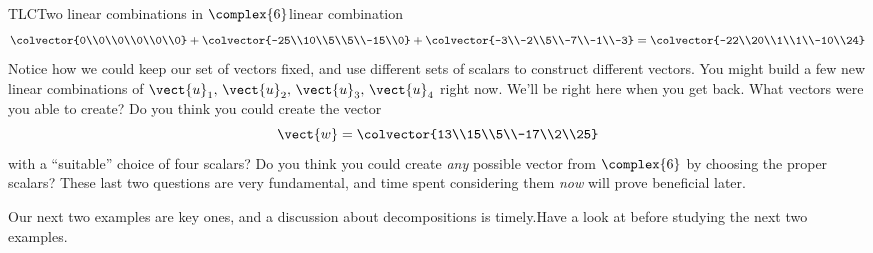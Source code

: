 \begin{example}{TLC}{Two linear combinations in $\complex{6}$}{linear combination}
\begin{align*}
\colvector{0\\0\\0\\0\\0\\0}+
\colvector{-25\\10\\5\\5\\-15\\0}+
\colvector{-3\\-2\\5\\-7\\-1\\-3}
%
=\colvector{-22\\20\\1\\1\\-10\\24}
\end{align*}
%
Notice how we could keep our set of vectors fixed, and use different sets of scalars to construct different vectors.  You might build a few new linear combinations of $\vect{u}_1,\,\vect{u}_2,\,\vect{u}_3,\,\vect{u}_4$ right now.  We'll be right here when you get back.  What vectors were you able to create?  Do you think you could create the vector
%
\begin{equation*}
\vect{w}=\colvector{13\\15\\5\\-17\\2\\25}
\end{equation*}
%
with a ``suitable'' choice of four scalars?  Do you think you could create {\em any} possible vector from $\complex{6}$ by choosing the proper scalars?  These last two questions are very fundamental, and time spent considering them {\em now} will prove beneficial later.
\end{example}
%
{Our next two examples are key ones, and a discussion about decompositions is timely.}{Have a look at  before studying the next two examples.}
%

